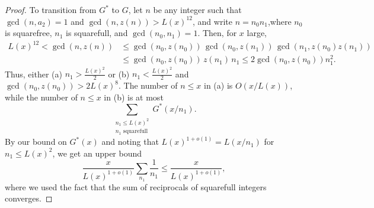 \documentclass[12pt,a4paper,oneside]{amsart}
\begin{document}
\begin{proof}
\medskip

To transition from $G^{*}$ to $G$, let $n$ be any integer such that $\gcd(n,a_2)=1$ and $\gcd(n,z(n))>L(x)^{12}$, and write $n=n_{0}n_1$,where $n_0$ is squarefree, $n_1$ is squarefull, and $\gcd(n_0,n_1)=1$. Then, for $x$ large,
\begin{align*}
    L(x)^{12} < \gcd(n,z(n)) &\le \gcd(n_0,z(n_0))\,\gcd(n_0,z(n_1))\,\gcd(n_1,z(n_0)z(n_1)) \\&\le \gcd(n_0,z(n_0))\,z(n_1)\,n_{1}\le 2\gcd(n_0,z(n_0)) n_1^{2}.
\end{align*}
Thus, either (a) $n_1 > \frac{L(x)^{2}}{2}$ or (b) $n_1 < \frac{L(x)^{2}}{2}$ and $\gcd(n_0,z(n_0))>2L(x)^{8}$. The number of $n\le x$ in (a) is $O(x/L(x))$, while the number of $n\le x$ in (b) is at most \[\sum_{\substack{ n_1\le L(x)^{2} \\ n_{1}\text{ squarefull}}} G^{*}(x/n_1).\]
By our bound on $G^{*}(x)$ and noting that $L(x)^{1+o(1)}=L(x/n_1)$ for $n_1\le L(x)^{2}$, we get an upper bound \[\frac{x}{L(x)^{1+o(1)}}\sum_{n_{1}}\frac1{n_1}\le \frac{x}{L(x)^{1+o(1)}},\] where we used the fact that the sum of reciprocals of squarefull integers converges.
\end{proof}
\end{document}
